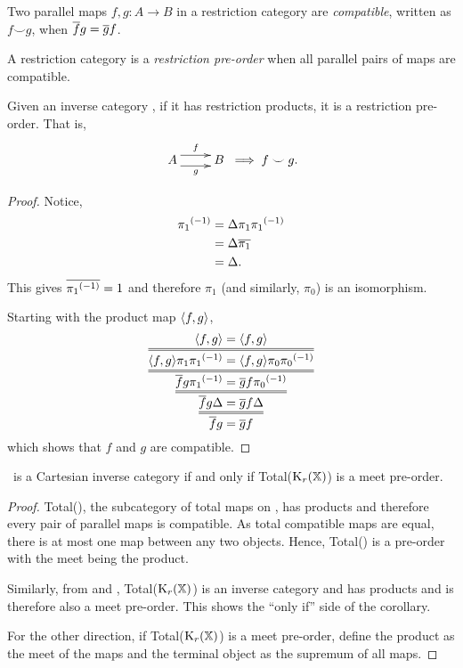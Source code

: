 \begin{definition}\label{def:compatible_maps}
  Two parallel maps $f,g:A \to B$ in a restriction category are \emph{compatible}, written as $f
  \smile g$, when $\overline{f} g = \overline{g} f$.
\end{definition}
\begin{definition}\label{def:restrictionpreorder}
  A restriction category \X is a \emph{restriction pre-order} when all parallel pairs of maps are
  compatible.
\end{definition}
\begin{lemma}\label{lem:an_inverse_category_with_products_is_a_restriction_preorder}
  Given an inverse category \X, if it has restriction products, it is a restriction pre-order. That
  is,
  \[
    \xymatrix {
      A  \ar@<1ex>[r]^{f} \ar@<-1ex>[r]_{g} &B
    }
    \implies f \smile g.
  \]
\end{lemma}
\begin{proof}
  Notice,
  \begin{align*}
    {\pi_1}^{(-1)} & = \Delta \pi_1 {\pi_1}^{(-1)}\\
    &=\Delta \overline{\pi_1}\\
    &=\Delta.
  \end{align*}
  This gives $\overline{{\pi_1}^{(-1)}} = 1$ and therefore $\pi_1$ (and similarly, $\pi_0$) is an
  isomorphism.

  Starting with the product map $\langle f,g\rangle$,
  \[
    \infer={\restr{f}g = \restr{g}f}
    {\infer={\restr{f}g\Delta = \restr{g}f\Delta}
    {\infer={\restr{f}g\inv{\pi_1} = \restr{g}f\inv{\pi_0}}
    {\infer={\<f,g\>\pi_1 \inv{\pi_1} = \<f,g\>\pi_0 \inv{\pi_0}}
    {\<f,g\> = \<f,g\>}}}}
  \]
  which shows that $f$ and $g$ are compatible.
\end{proof}

\begin{corollary}
  \X\ is a Cartesian inverse category if and only if Total($\text{K}_{r}(\mathbb{X})$) is a meet pre-order.
\end{corollary}

\begin{proof}
  Total(\X), the subcategory of total maps on \X, has products and therefore every pair of parallel
  maps is compatible. As total compatible maps are equal, there is at most
  one map between any two objects. Hence, Total(\X) is a pre-order with the meet being the product.

  Similarly, from \cite{cockett2002:restcategories1} and \cite{cockettlack2004:restcategories3},
  Total($\text{K}_{r}(\mathbb{X})$) is an inverse category and has products and is therefore also a meet
  pre-order. This shows the ``only if'' side of the corollary.

  For the other direction, if Total($\text{K}_{r}(\mathbb{X})$) is a meet pre-order, define the product as the
  meet of the maps and the terminal object as the supremum of all maps.
\end{proof}

